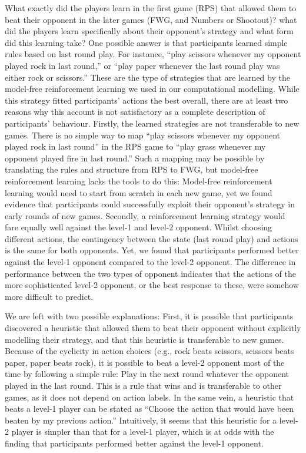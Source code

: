 \documentclass[
  english,
  man,floatsintext]{apa6}
\begin{document}
What exactly did the players learn in the first game (RPS) that allowed them to beat their opponent in the later games (FWG, and Numbers or Shootout)? what did the players learn specifically about their opponent's strategy and what form did this learning take?
One possible answer is that participants learned simple rules based on last round play. For instance, ``play scissors whenever my opponent played rock in last round,'' or ``play paper whenever the last round play was either rock or scissors.'' These are the type of strategies that are learned by the model-free reinforcement learning we used in our computational modelling. While this strategy fitted participants' actions the best overall, there are at least two reasons why this account is not satisfactory as a complete description of participants' behaviour. Firstly, the learned strategies are not transferable to new games. There is no simple way to map ``play scissors whenever my opponent played rock in last round'' in the RPS game to ``play grass whenever my opponent played fire in last round.'' Such a mapping may be possible by translating the rules and structure from RPS to FWG, but model-free reinforcement learning lacks the tools to do this: Model-free reinforcement learning would need to start from scratch in each new game, yet we found evidence that participants could successfully exploit their opponent's strategy in early rounds of new games. Secondly, a reinforcement learning strategy would fare equally well against the level-1 and level-2 opponent. Whilst choosing different actions, the contingency between the state (last round play) and actions is the same for both opponents. Yet, we found that participants performed better against the level-1 opponent compared to the level-2 opponent. The difference in performance between the two types of opponent indicates that the actions of the more sophisticated level-2 opponent, or the best response to these, were somehow more difficult to predict.

We are left with two possible explanations: First, it is possible that participants discovered a heuristic that allowed them to beat their opponent without explicitly modelling their strategy, and that this heuristic is transferable to new games. Because of the cyclicity in action choices (e.g., rock beats scissors, scissors beats paper, paper beats rock), it is possible to beat a level-2 opponent most of the time by following a simple rule: Play in the next round whatever the opponent played in the last round. This is a rule that wins and is transferable to other games, as it does not depend on action labels. In the same vein, a heuristic that beats a level-1 player can be stated as ``Choose the action that would have been beaten by my previous action.'' Intuitively, it seems that this heuristic for a level-2 player is simpler than that for a level-1 player, which is at odds with the finding that participants performed better against the level-1 opponent.
\end{document}

